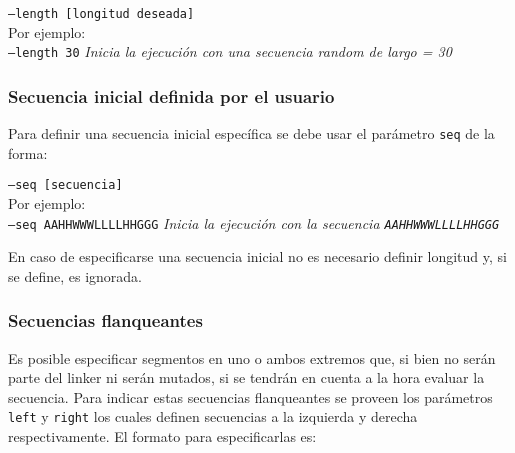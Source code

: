 \indent \texttt{--length [longitud deseada]}
\\Por ejemplo: \\
\indent \texttt{--length 30} \hspace{0.5cm} \textit{Inicia la ejecución con una secuencia random de largo = 30}



\subsubsection{Secuencia inicial definida por el usuario}\label{secuenciaInicialDefinida}

Para definir una secuencia inicial específica se debe usar el parámetro \texttt{seq} de la forma:

\indent \texttt{--seq [secuencia]} 
\\Por ejemplo: \\
\indent \texttt{--seq AAHHWWWLLLLHHGGG} \hspace{0.5cm} \textit{Inicia la ejecución con la secuencia \texttt{AAHHWWWLLLLHHGGG}}

En caso de especificarse una secuencia inicial no es necesario definir longitud y, si se define, es ignorada.



\subsubsection{Secuencias flanqueantes}\label{flanqueantes} 

Es posible especificar segmentos en uno o ambos extremos que, si bien no serán parte del linker ni serán mutados, si se tendrán en cuenta a la hora evaluar la secuencia.
Para indicar estas secuencias flanqueantes se proveen los parámetros \texttt{left} y \texttt{right} los cuales definen secuencias a la izquierda y derecha respectivamente.
El formato para especificarlas es:


